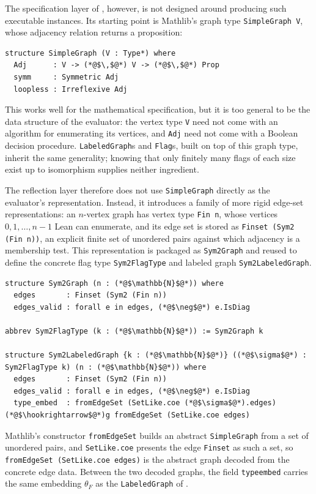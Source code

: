 \documentclass[acmsmall,screen=true,acmthm=false]{acmart}
\DeclareRobustCommand{\lean}[1]{{\def\_{\textunderscore\allowbreak}\texttt{#1}}}
\begin{document}
The specification layer of , however, is not designed
around producing such executable instances.  Its starting point is Mathlib's graph type
\lean{SimpleGraph V}, whose adjacency relation returns a proposition:
\begin{lstlisting}
structure SimpleGraph (V : Type*) where
  Adj      : V -> (*@$\,$@*) V -> (*@$\,$@*) Prop
  symm     : Symmetric Adj
  loopless : Irreflexive Adj
\end{lstlisting}
This works well for the mathematical specification, but it is too general to be
the data structure of the evaluator: the vertex type \lean{V} need not come with
an algorithm for enumerating its vertices, and \lean{Adj} need not come with a
Boolean decision procedure.  \lean{LabeledGraph}s and \lean{Flag}s, built on top
of this graph type, inherit the same generality; knowing that only finitely many
flags of each size exist up to isomorphism supplies neither ingredient.

The reflection layer therefore does not use \lean{SimpleGraph} directly as the
evaluator's representation.  Instead, it introduces a family of more rigid
edge-set representations: an \(n\)-vertex graph has vertex type \lean{Fin n},
whose vertices \(0,1,\ldots,n-1\) Lean can enumerate, and its edge set is stored
as \lean{Finset (Sym2 (Fin n))}, an explicit finite set of unordered pairs
against which adjacency is a membership test.  This representation is packaged
as \lean{Sym2Graph} and reused to define the concrete flag type
\lean{Sym2FlagType} and labeled graph \lean{Sym2LabeledGraph}.
\begin{lstlisting}
structure Sym2Graph (n : (*@$\mathbb{N}$@*)) where
  edges       : Finset (Sym2 (Fin n))
  edges_valid : forall e in edges, (*@$\neg$@*) e.IsDiag

abbrev Sym2FlagType (k : (*@$\mathbb{N}$@*)) := Sym2Graph k

structure Sym2LabeledGraph {k : (*@$\mathbb{N}$@*)} ((*@$\sigma$@*) : Sym2FlagType k) (n : (*@$\mathbb{N}$@*)) where
  edges       : Finset (Sym2 (Fin n))
  edges_valid : forall e in edges, (*@$\neg$@*) e.IsDiag
  type_embed  : fromEdgeSet (SetLike.coe (*@$\sigma$@*).edges) (*@$\hookrightarrow$@*)g fromEdgeSet (SetLike.coe edges)
\end{lstlisting}
Mathlib's constructor \lean{fromEdgeSet} builds an abstract \lean{SimpleGraph}
from a set of unordered pairs, and \lean{SetLike.coe} presents the edge
\lean{Finset} as such a set, so \lean{fromEdgeSet (SetLike.coe edges)} is the abstract graph decoded
from the concrete edge data.  Between the two decoded graphs, the field
\lean{type\_embed} carries the same embedding \(\theta_F\) as the
\lean{LabeledGraph} of .
\end{document}
